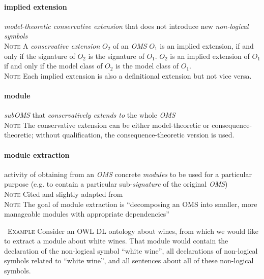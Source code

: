 \documentclass[10pt,%
\ifpretendfinal
final%
\else
draft%
\fi,
]{scrreprt}
\makeatletter
\newcommand*{\eg}{e.g.\@\xspace}
\newcommand*\CommentAuthor{}
\renewcommand*\CommentAuthor{#1}}
\newcommand*\CommentDate{}
\renewcommand*\CommentDate{#1}}
\newcommand*\CommentId{}
\renewcommand*\CommentId{#1}}
\newcommand*\CommentType{}
\renewcommand*\CommentType{#1}}
\newcommand*{\SetCommentColorByType}[1]{%
\edef\localType{{#1}}%
\expandafter\ifstrequal\localType{q-aut}{\colorlet{CommentColor}{red}}{%
\expandafter\ifstrequal\localType{q-all}{\colorlet{CommentColor}{orange}}{%
\expandafter\ifstrequal\localType{todo}{\colorlet{CommentColor}{orange}}{%
\expandafter\ifstrequal\localType{fyi}{\colorlet{CommentColor}{lightgray}}{%
\colorlet{CommentColor}{yellow}}}}}}
\newcommand*{\SetCommentPrefixByType}[1]{%
\edef\localType{{#1}}%
\expandafter\@ifmtarg\localType{%
\edef\CommentPrefix{}%
}{%
\caseupper[q]{#1}%
\edef\CommentPrefix{\thestring: }%
}}
\newcommand*{\initComment}[1]{%
\setkeys{Comment}{#1}%
\SetCommentColorByType{\CommentType}%
\relax%
\SetCommentPrefixByType{\CommentType}%
\relax%
}
\newcommand*{\todonote}[2][]{%
\initComment{#1}%
\pdfcomment[author=\CommentAuthor,color=CommentColor,date=\CommentDate,id=\CommentId]{%
\CommentPrefix
#2}}
\newcommand*{\todonoteURL}[1]{#1}
\renewcommand*{\todonote}[2][]{%
\initComment{#1}%
\ednote{\CommentPrefix #2}}
\renewcommand*{\todonoteURL}[1]{\url{#1}}
\newcommand*{\termref}[1]{\textit{#1}}
\newcommand{\termdefinition}[2]{\paragraph{#1} #2}
\newenvironment{definitions}[0]{\medskip }{}
\newenvironment{note}[0]{\ \\ \textsc{Note} \quad}{}
\newenvironment{example}[0]{\ \newline \textsc{Example}\quad }{}
\makeatother
\begin{document}
\begin{definitions}
  \termdefinition{implied extension}{\termref{model-theoretic conservative extension} that does not introduce new \termref{non-logical symbols}}
  \begin{note}
    A \termref{conservative extension} $O_2$ of an \termref{OMS}
    $O_1$ is an implied extension, if and only if the signature of
    $O_2$ is the signature of $O_1$.  $O_2$ is an implied extension of
    $O_1$ if and only if the model class of $O_2$ is the model class
    of $O_1$.
  \end{note}
  \begin{note}
    Each implied extension is also a definitional extension but not vice versa.
  \end{note}

  \termdefinition{module}{\termref{subOMS} that \termref{conservatively extends to} the whole \termref{OMS}}
  \begin{note}
    The conservative extension can be either model-theoretic or consequence-theoretic; without qualification, the consequence-theoretic version is used.
  \end{note}

  \termdefinition{module extraction}{activity of obtaining from an \termref{OMS} concrete \termref{modules} to be used for a particular purpose (\eg to contain a particular sub-\termref{signature} of the original \termref{OMS})}
  \begin{note}
    Cited and slightly adapted from \cite{SuarezFigueroaEtAl:OntologyGlossary2008}
  \end{note}
  \begin{note}
    The goal of module extraction is ``decomposing an OMS into smaller, more manageable modules with appropriate dependencies'' \cite{DBLP:series/lncs/5445}
  \end{note}

  \begin{example}
    Consider an OWL DL ontology about wines, from which we would like to extract a module about white wines. That module would contain the declaration of the non-logical symbol ``white wine'', all declarations of non-logical symbols related to ``white wine'', and all sentences about all of these non-logical symbols.
  \end{example}



\end{definitions}
\end{document}
